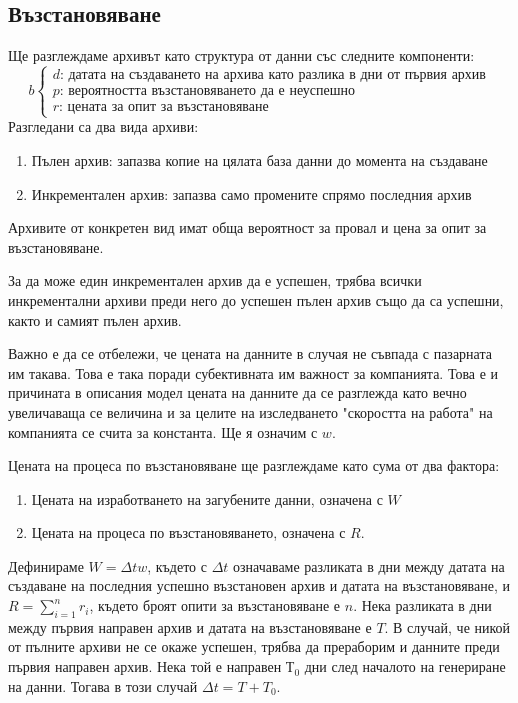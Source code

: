 \documentclass[11pt, a4paper]{article}
\theoremstyle{definition}
\begin{document}
	\subsection{Възстановяване}
		Ще разглеждаме архивът като структура от данни със следните компоненти:
		$$
		b
		\begin{cases}
		d \text{: датата на създаването на архива като разлика в дни от първия архив}\\
		p \text{: вероятността възстановяването да е неуспешно}\\
		r \text{: цената за опит за възстановяване}
		\end{cases}
		$$
		Разгледани са два вида архиви:
		\begin{enumerate}
			\item Пълен архив: запазва копие на цялата база данни до момента на създаване
			\item Инкрементален архив: запазва само промените спрямо последния архив
		\end{enumerate}
		Архивите от конкретен вид имат обща вероятност за провал и цена за опит за възстановяване. \par
		За да може един инкрементален архив да е успешен, трябва всички инкрементални архиви преди него до успешен пълен архив също да са успешни, както и самият пълен архив.\par
		Важно е да се отбележи, че цената на данните в случая не съвпада с пазарната им такава. Това е така поради субективната им важност за компанията. Това е и причината в описания модел цената на данните да се разглежда като вечно увеличаваща се величина и за целите на изследването "скоростта на работа" на компанията се счита за константа. Ще я означим с $w$.\par
		Цената на процеса по възстановяване ще разглеждаме като сума от два фактора:
		\begin{enumerate}
			\item Цената на изработването на загубените данни, означена с $W$
			\item Цената на процеса по възстановяването, означена с $R$.
		\end{enumerate}
		Дефинираме $W = \Delta tw$, където с $\Delta t$ означаваме разликата в дни между датата на създаване на последния успешно възстановен архив и датата на възстановяване, и $R = \sum_{i=1}^{n} r_i$, където броят опити за възстановяване е $n$.
		Нека разликата в дни между първия направен архив и датата на възстановяване е $T$. В случай, че никой от пълните архиви не се окаже успешен, трябва да прераборим и данните преди първия направен архив. Нека той е направен $Т_0$ дни след началото на генериране на данни. Тогава в този случай $\Delta t= T+T_0$.\par
		\newpage
\end{document}
